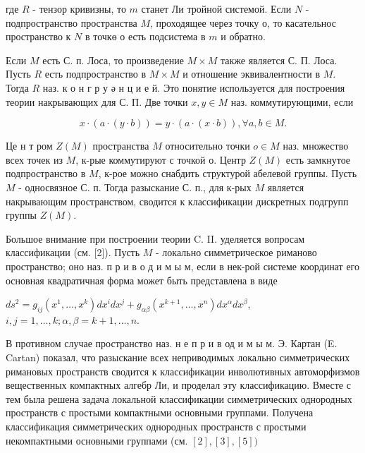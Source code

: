 \documentclass[10pt]{article}
\begin{document}
где $R$ - тензор кривизны, то $m$ станет $Л и$ тройной системой. Если $N$ - подпространство пространства $M$, проходящее через точку о, то касательнос пространство к $N$ в точкө о есть подсистема в $m$ и обратно.



Если $M$ есть С. п. Лоса, то произведение $M \times M$ также является С. П. Лоса. Пусть $R$ есть подпространство в $M \times M$ и отношение эквивалентности в $M$. Тогда $R$ наз. к о н г р у ә н ц и е й. Это понятие используется для построения теории накрывающих для С. П. Две точки $x, y \in M$ наз. коммутирующими, если



\[

x \cdot(a \cdot(y \cdot b))=y \cdot(a \cdot(x \cdot b)), \forall a, b \in M .

\]



Це н т ром $Z(M)$ пространства $M$ относительно точки $o \in M$ наз. множество всех точек из $M$, к-рые коммутируют с точкой $о$. Центр $Z(M)$ есть замкнутое подпространство в $M$, к-рое можно снабдить структурой абелевой группы. Пусть $M$ - односвязное С. п. Тогда разыскание С. п., для к-рых $M$ является накрывающим пространством, сводится к классификации дискретных подгрупп группы $Z(M)$.



Большое внимание при построении теории C. II. уделяется вопросам классификации (см. [2]). Пусть $M$ - локально симметрическое риманово пространство; оно наз. п р и в о д и м ы м, если в нек-рой системе координат его основная квадратичная форма может быть представлена в виде



$d s^{2}=g_{i j}\left(x^{1}, \ldots, x^{k}\right) d x^{i} d x^{j}+g_{\alpha \beta}\left(x^{k+1}, \ldots, x^{n}\right) d x^{\alpha} d x^{\beta}$, $i, j=1, \ldots, k ; \alpha, \beta=k+1, \ldots, n$.



В противном случае пространство наз. н е п р и в од и м ы м. Э. Картан (E. Cartan) показал, что разыскание всех неприводимых локально симметрических римановых пространств сводится к классификации инволютивных автоморфизмов вещественных компактных алгебр Ли, и проделал эту классификацию. Вместе с тем была решена задача локальной классификации симметрических однородных пространств с простыми компактными основными группами. Получена классификация симметрических однородных пространств с простыми некомпактными основными группами (см. $[2],[3],[5])$
\end{document}
